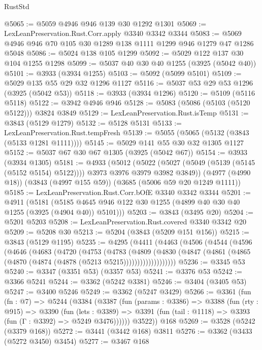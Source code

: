 \begin{lexlean}{RustStd}
\begin{coremodule}
@5065 := @5059 @4946 @946 @139 @30 @1292 @1301
@5069 := LexLeanPreservation.Rust.Corr.apply @3340 @3342 @3344
@5083 := @5069 @4946 @946 @70 @105 @30 @1289 @138 @1111 @1299 @946 @1279 @47 @1286 @5048
@5086 := @5024 @138 @105 @1299
@5092 := @5029 @122 @137 @30 @104 @1255 @1298
@5099 := @5037 @40 @30 @40 @1255 (@3925 (@5042 @40))
@5101 := @3933 (@3934 @1255)
@5103 := @5092 (@5099 @5101)
@5109 := @5029 @135 @55 @29 @32 @1296 @1127
@5116 := @5037 @53 @29 @53 @1296 (@3925 (@5042 @53))
@5118 := @3933 (@3934 @1296)
@5120 := @5109 (@5116 @5118)
@5122 := @3942 @4946 @946
@5128 := @5083 (@5086 (@5103 (@5120 @5122))) @3824 @3849
@5129 := LexLeanPreservation.Rust.isTemp
@5131 := @3843 (@5129 @1279)
@5132 := @5128 @5131
@5133 := LexLeanPreservation.Rust.tempFresh
@5139 := @5055 (@5065 (@5132 (@3843 (@5133 @1281 @1111))))
@5145 := @5029 @141 @55 @30 @32 @1305 @1127
@5152 := @5037 @67 @30 @67 @1305 (@3925 (@5042 @67))
@5154 := @3933 (@3934 @1305)
@5181 := @4933
    (@5012
      (@5022 (@5027 (@5049 (@5139 (@5145 (@5152 @5154) @5122)))) @3973 @3976 @3979 @3982 @3849))
    (@4977 (@4990 @18))
    (@3843 (@4997 @155 @59))
    (@3685 (@5006 @59 @20 @1249 @1111))
@5185 := LexLeanPreservation.Rust.Corr.bOfE @3340 @3342 @3344
@5201 := @4911
    (@5181 (@5185 @4645 @946 @122 @30 @1255 (@4899 @40 @30 @40 @1255 (@3925 (@4904 @40)) @5101)))
@5203 := @3843 (@3495 @20)
@5204 := @5201 @5203
@5208 := LexLeanPreservation.Rust.covered @3340 @3342 @20
@5209 := @5208 @30
@5213 := @5204 (@3843 (@5209 @151 @156))
@5215 := @3843 (@5129 @1195)
@5235 := @4295
    (@4411
      (@4463
        (@4506
          (@4544
            (@4596
              (@4646
                (@4683
                  (@4720
                    (@4753
                      (@4783
                        (@4809
                          (@4830
                            (@4847
                              (@4861 (@4865 (@4870 (@4874 (@4878 (@5213 @5215)))))))))))))))))))
@5236 := @3345 @53
@5240 := @3347 (@3351 @53) (@3357 @53)
@5241 := @3376 @53
@5242 := @3366 @5241
@5244 := @3362 (@5242 @3381)
@5246 := @3404 (@3405 @53)
@5247 := @3400 @5246
@5249 := @3362 (@5247 @3429)
@5266 := @3361
    (fun (fn : @7) =>
    @5244
      (@3384
        (@3387
          (fun (params : @3386) =>
          @3388
            (fun (rty : @915) =>
            @3390
              (fun (lets : @3389) =>
              @3391 (fun (tail : @1118) => @3393 (fun (Γ : @3392) => @5249 @3476))))))
        @3522))
    @168
@5269 := @3528 (@5242 (@3379 @168))
@5272 := @3441 (@3442 @168) @3811
@5276 := @3362 (@3433 (@5272 @3450) @3454)
@5277 := @3467 @168

\end{coremodule}
\end{lexlean}

